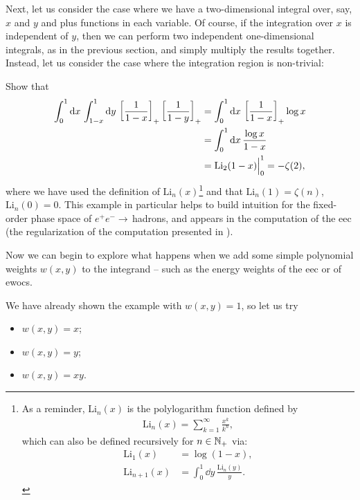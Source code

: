 \begin{subappendices}
Next, let us consider the case where we have a two-dimensional integral over, say, \(x\) and \(y\) and plus functions in each variable.
%
Of course, if the integration over \(x\) is independent of \(y\), then we can perform two independent one-dimensional integrals, as in the previous section, and simply multiply the results together.
%
Instead, let us consider the case where the integration region is non-trivial:

\begin{exercise}

    Show that
    \begin{align}
        \int_{0}^{1} \dd x\,
        \int_{1-x}^{1} \dd y\,
        \le[\frac{1}{1-x}\ri]_+
        \le[\frac{1}{1-y}\ri]_+
        &=
        \int_{0}^{1} \dd x\,
        \le[\frac{1}{1-x}\ri]_+
        \log x
        \label{eq:simple_2d}
        \\
        &=
        \int_{0}^{1} \dd x\,
        \frac{\log x}{1-x}
        \notag
        \\
        &= \text{Li}_2(1-x)\Big|^1_0 = -\zeta(2)
        \label{eq:simple_2d_soln}
        ,
    \end{align}
    where we have used the definition of \(\text{Li}_n(x)\)\footnote{
        As a reminder, \(\text{Li}_n(x)\) is the polylogarithm function defined by
        \begin{align}
            \text{Li}_n(x) = \sum_{k=1}^\infty \frac{x^k}{k^n}
            ,
        \end{align}
        which can also be defined recursively for \(n \in \mathbb N_+\) via:
        \begin{align}
            \text{Li}_1(x) &= \log(1-x)
            ,
            \\
            \text{Li}_{n+1}(x) &= \int_0^1 \dd y\, \frac{\text{Li}_n(y)}{y}
            .
        \end{align}
    } and that \(\text{Li}_n(1) = \zeta(n)\), \(\text{Li}_n(0) = 0\).
    This example in particular helps to build intuition for the fixed-order phase space of \(e^+e^-\to\,\)hadrons, and appears in the computation of the \gls{eec} (the regularization of the computation presented in ).
\end{exercise}


Now we can begin to explore what happens when we add some simple polynomial weights \(w(x,y)\) to the integrand -- such as the energy weights of the \gls{eec} or of \glspl{ewoc}.

\begin{example}
We have already shown the example with \(w(x,y) = 1\), so let us try
\begin{itemize}
    \item
        \(w(x,y) = x\);
    \item
        \(w(x,y) = y\);
    \item
        \(w(x,y) = x y\).
\end{itemize}


\end{example}
\end{subappendices}

